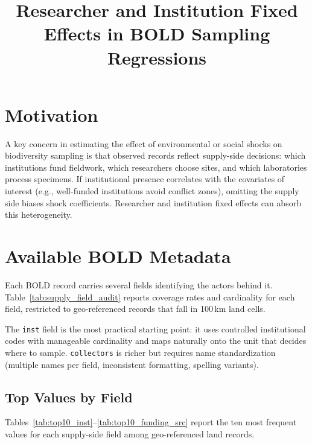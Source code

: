 \documentclass[10pt]{article}
\title{\vspace{-1.2cm}Researcher and Institution Fixed Effects in BOLD Sampling Regressions}
\author{}
\date{\vspace{-0.8cm}}
\begin{document}
\maketitle
\vspace{-1.0cm}

\section*{Motivation}

A key concern in estimating the effect of environmental or social shocks on biodiversity sampling is that observed records reflect supply-side decisions: which institutions fund fieldwork, which researchers choose sites, and which laboratories process specimens. If institutional presence correlates with the covariates of interest (e.g., well-funded institutions avoid conflict zones), omitting the supply side biases shock coefficients. Researcher and institution fixed effects can absorb this heterogeneity.

\section*{Available BOLD Metadata}

Each BOLD record carries several fields identifying the actors behind it. Table~\ref{tab:supply_field_audit} reports coverage rates and cardinality for each field, restricted to geo-referenced records that fall in 100\,km land cells.



The \texttt{inst} field is the most practical starting point: it uses controlled institutional codes with manageable cardinality and maps naturally onto the unit that decides where to sample. \texttt{collectors} is richer but requires name standardization (multiple names per field, inconsistent formatting, spelling variants).

\subsection*{Top Values by Field}

Tables~\ref{tab:top10_inst}--\ref{tab:top10_funding_src} report the ten most frequent values for each supply-side field among geo-referenced land records.







\end{document}
